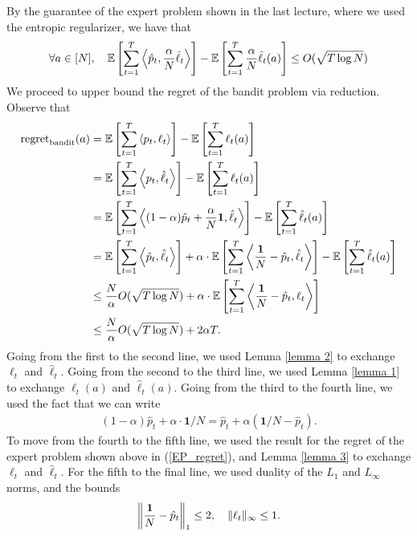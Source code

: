 \documentclass[11pt]{article}
\begin{document}
By the guarantee of the expert problem shown in the last lecture, where we used the entropic regularizer, we have that
\begin{align} \label{EP_regret}
    \forall a \in [N], \quad \mathbb{E}\left[ \sum_{t=1}^T \left\langle \hat{p}_t, \dfrac{\alpha}{N} \hat{\ell}_t\right\rangle \right] - \mathbb{E}\left[\sum_{t=1}^T \dfrac{\alpha}{N} \hat{\ell}_t(a) \right] \leq O(\sqrt{T \log N})
\end{align}
We proceed to upper bound the regret of the bandit problem via reduction. Observe that
\begin{align} \label{bandit_to_EP}
    \text{regret}_{\text{bandit}}(a) &= \mathbb{E} \left[ \sum_{t=1}^T \left\langle p_t, \ell_t \right\rangle \right] - \mathbb{E} \left[ \sum_{t=1}^T \ell_t(a) \right] \nonumber\\
    &= \mathbb{E} \left[ \sum_{t=1}^T \left\langle p_t, \hat{\ell}_t \right\rangle \right] - \mathbb{E} \left[ \sum_{t=1}^T \ell_t(a) \right] \nonumber\\
    &= \mathbb{E} \left[ \sum_{t=1}^T \left\langle (1 - \alpha) \hat{p}_t + \dfrac{\alpha}{N} \mathbf{1}, \hat{\ell}_t \right\rangle \right] - \mathbb{E} \left[ \sum_{t=1}^T \hat{\ell}_t(a) \right] \nonumber\\
    &= \mathbb{E}\left[ \sum_{t=1}^T \left\langle \hat{p}_t, \hat{\ell}_t \right\rangle \right] + \alpha \cdot  \mathbb{E} \left[ \sum_{t=1}^T \left\langle \dfrac{\mathbf{1}}{N} - \hat{p}_t, \hat{\ell}_t \right\rangle \right] - \mathbb{E}\left[ \sum_{t=1}^T \hat{\ell}_t(a) \right] \nonumber\\
    &\leq \dfrac{N}{\alpha} O(\sqrt{T \log N}) + \alpha \cdot \mathbb{E} \left[ \sum_{t=1}^T \left\langle \dfrac{\mathbf{1}}{N} - \hat{p}_t, \ell_t \right\rangle\right] \nonumber \\
    &\leq \dfrac{N}{\alpha} O(\sqrt{T \log N}) + 2\alpha T.
\end{align}
Going from the first to the second line, we used Lemma \ref{lemma 2} to exchange $\ell_t$ and $\hat{\ell}_t$. Going from the second to the third line, we used Lemma \ref{lemma 1} to exchange $\ell_t(a)$ and $\hat{\ell}_t(a)$. Going from the third to the fourth line, we used the fact that we can write 
\begin{align*}
    (1 - \alpha) \hat{p}_t + \alpha \cdot \mathbf{1}/N = \hat{p}_t + \alpha(\mathbf{1}/N - \hat{p}_t).
\end{align*}
To move from the fourth to the fifth line, we used the result for the regret of the expert problem shown above in (\ref{EP_regret}), and Lemma \ref{lemma 3} to exchange $\ell_t$ and $\hat{\ell}_t$.
For the fifth to the final line, we used duality of the $L_1$ and $L_{\infty}$ norms, and the bounds
\begin{gather*}
    \left\Vert \dfrac{\mathbf{1}}{N} - \hat{p}_t \right\Vert_1 \leq 2, \quad \lVert\ell_t\rVert_{\infty} \leq 1.
\end{gather*}
\end{document}
